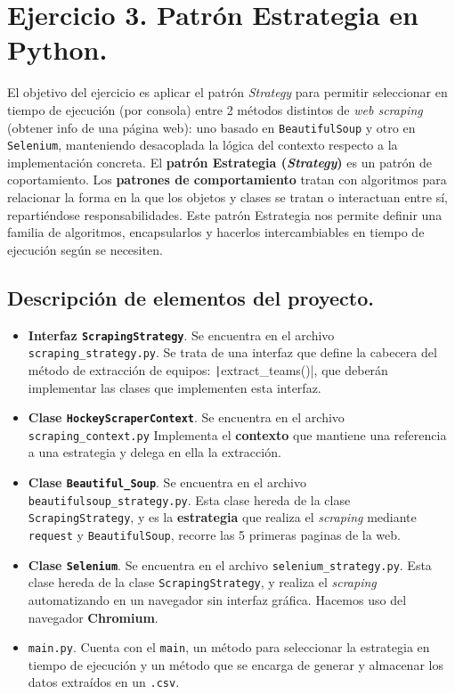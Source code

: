 \documentclass[a4paper,12pt]{article}
\begin{document}
	\section{Ejercicio 3. Patrón Estrategia en Python.}
		El objetivo del ejercicio es aplicar el patrón \textit{Strategy} para permitir seleccionar en tiempo de ejecución (por consola) entre 2 métodos distintos de \textit{web scraping} (obtener info de una página web): uno basado en \texttt{BeautifulSoup} y otro en \texttt{Selenium}, manteniendo desacoplada la lógica del contexto respecto a la implementación concreta. 
		El \textbf{patrón Estrategia (\textit{Strategy})} es un patrón de coportamiento. Los \textbf{patrones de comportamiento} tratan con algoritmos para relacionar la forma en la que los objetos y clases se tratan o interactuan entre sí, repartiéndose responsabilidades. Este patrón Estrategia nos permite definir una familia de algoritmos, encapsularlos y hacerlos intercambiables en tiempo de ejecución según se necesiten.
		
		\subsection{Descripción de elementos del proyecto.}
			\begin{itemize}
				\item \textbf{Interfaz \texttt{ScrapingStrategy}}. Se encuentra en el archivo \texttt{scraping\_strategy.py}. Se trata de una interfaz que define la cabecera del método de extracción de equipos: \texttt|extract_teams()|, que deberán implementar las clases que implementen esta interfaz.
				
				 \item \textbf{Clase \texttt{HockeyScraperContext}}. Se encuentra en el archivo \texttt{scraping\_context.py} Implementa el \textbf{contexto} que mantiene una referencia a una estrategia y delega en ella la extracción.
				 
				 \item \textbf{Clase \texttt{Beautiful\_Soup}}. Se encuentra en el archivo \texttt{beautifulsoup\_strategy.py}. Esta clase hereda de la clase \texttt{ScrapingStrategy}, y es la  \textbf{estrategia}  que realiza el \textit{scraping} mediante \texttt{request} y \texttt{BeautifulSoup}, recorre las 5 primeras paginas de la web.
				 
				 \item \textbf{Clase \texttt{Selenium}}. Se encuentra en el archivo \texttt{selenium\_strategy.py}. Esta clase hereda de la clase \texttt{ScrapingStrategy}, y realiza el \textit{scraping} automatizando en un navegador sin interfaz gráfica. Hacemos uso del navegador \textbf{Chromium}. 
				 
				 \item \texttt{main.py}.  Cuenta con el \texttt{main}, un método para seleccionar la estrategia en tiempo de ejecución y un método que se encarga de generar y almacenar los datos extraídos en un \texttt{.csv}.
			\end{itemize}
			
\end{document}
